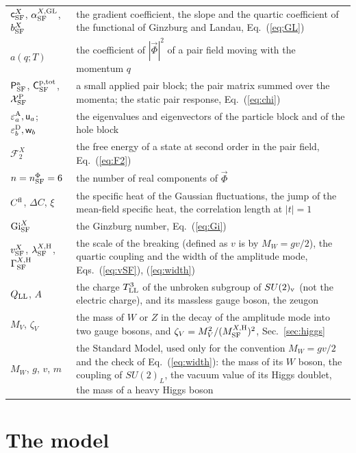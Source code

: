 \documentclass[aps,prd,onecolumn,superscriptaddress,nofootinbib,floatfix,longbibliography]{revtex4-2}
\newcommand{\LL}{{\rm LL}}
\newcommand{\SF}{{\rm SF}}
\begin{document}
\begin{longtable}{p{}p{}}
$\mathsf c^X_\SF$, $\alpha^{X,{\rm GL}}_\SF$, $b^X_\SF$ & the gradient coefficient, the slope and the quartic coefficient of the functional of Ginzburg and Landau, Eq.~(\ref{eq:GL}) \\
$a(q;T)$ & the coefficient of $|\vec\Phi|^2$ of a pair field moving with the momentum $q$ \\
$\mathsf P^{\rm a}_\SF$, $\mathsf C^{\rm p,tot}_\SF$, $\mathcal X^{\rm P}_\SF$ & a small applied pair block; the pair matrix summed over the momenta; the static pair response, Eq.~(\ref{eq:chi}) \\
$\varepsilon^{\rm A}_a,\mathsf u_a$; $\varepsilon^{\rm D}_b,\mathsf w_b$ & the eigenvalues and eigenvectors of the particle block and of the hole block \\
$\mathcal F^X_2$ & the free energy of a state at second order in the pair field, Eq.~(\ref{eq:F2}) \\
$n=n^\Phi_\SF=6$ & the number of real components of $\vec\Phi$ \\
$C^{\rm fl}$, $\Delta C$, $\xi$ & the specific heat of the Gaussian fluctuations, the jump of the mean-field specific heat, the correlation length at $|t|=1$ \\
${\rm Gi}^X_\SF$ & the Ginzburg number, Eq.~(\ref{eq:Gi}) \\
$v^X_\SF$, $\lambda^{X,{\rm H}}_\SF$, $\Gamma^{X,{\rm H}}_\SF$ & the scale of the breaking (defined as $v$ is by $M_W=gv/2$), the quartic coupling and the width of the amplitude mode, Eqs.~(\ref{eq:vSF}), (\ref{eq:width}) \\
$Q_\LL$, $A$ & the charge $T^3_\LL$ of the unbroken subgroup of $SU(2)_{\rm v}$ (not the electric charge), and its massless gauge boson, the zeugon \\
$M_V$, $\zeta_V$ & the mass of $W$ or $Z$ in the decay of the amplitude mode into two gauge bosons, and $\zeta_V=M_V^2/(M^{X,{\rm H}}_\SF)^2$, Sec.~\ref{sec:higgs} \\
$M_W$, $g$, $v$, $m$ & the Standard Model, used only for the convention $M_W=gv/2$ and the check of Eq.~(\ref{eq:width}): the mass of its $W$ boson, the coupling of $SU(2)_L$, the vacuum value of its Higgs doublet, the mass of a heavy Higgs boson \\
\end{longtable}
\endgroup

\section{The model}
\label{sec:model}
\end{document}
